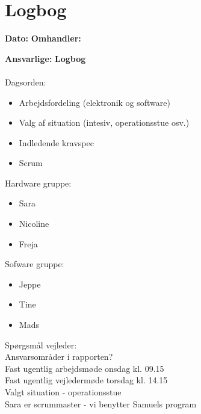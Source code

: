 \chapter{Logbog}

\textbf{Dato:} 
\textbf{Omhandler:} 

\textbf{Ansvarlige:} 
\textbf{Logbog}
\\
\\
Dagsorden:
\begin{itemize}
	\item Arbejdsfordeling (elektronik og software)
	\item Valg af situation (intesiv, operationsstue osv.)
	\item Indledende kravspec
	\item Scrum
\end{itemize}

Hardware gruppe:
\begin{itemize}
	\item Sara
	\item Nicoline
	\item Freja
\end{itemize}

Sofware gruppe:
\begin{itemize}
	\item Jeppe 
	\item Tine
	\item Mads
\end{itemize}

Spørgsmål vejleder: \\
Ansvarsområder i rapporten?\\
Fast ugentlig arbejdsmøde onsdag kl. 09.15\\
Fast ugentlig vejledermøde torsdag kl. 14.15\\

Valgt situation - operationsstue\\
Sara er scrummaster - vi benytter Samuels program\\
